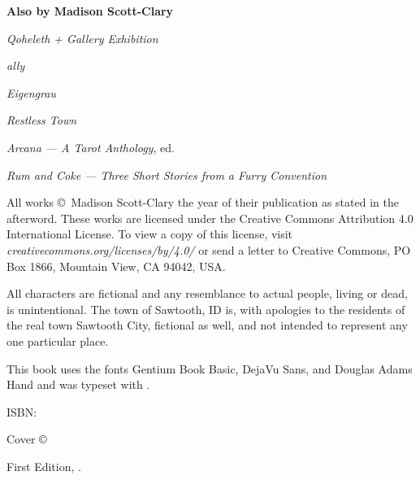 
\thispagestyle{empty}
\null
\vfill
\begin{center}
    \textbf{Also by Madison Scott-Clary}

    \emph{Qoheleth + Gallery Exhibition}

    \emph{ally}

    \emph{Eigengrau}

    \emph{Restless Town}

    \emph{Arcana --- A Tarot Anthology}, ed.

    \emph{Rum and Coke --- Three Short Stories from a Furry Convention}
\end{center}
\vfill
\singlespacing
{\small\parindent0pt\parskip5pt
\noindent All works \copyright\ Madison Scott-Clary the year of their publication as stated in the afterword. These works are licensed under the Creative Commons Attribution 4.0 International License. To view a copy of this license, visit \mbox{\emph{creativecommons.org/licenses/by/4.0/}} or send a letter to Creative Commons, PO Box 1866, Mountain View, CA 94042, USA.

All characters are fictional and any resemblance to actual people, living or dead, is unintentional. The town of Sawtooth, ID is, with apologies to the residents of the real town Sawtooth City, fictional as well, and not intended to represent any one particular place.

This book uses the fonts Gentium Book Basic, DejaVu Sans, and Douglas Adams Hand and was typeset with {\XeLaTeX}.

\vspace{1ex}

ISBN: \ISBN

\vspace{1ex}

\emph{\Title}

\vspace{1ex}

Cover \copyright\ \Year\ \Illustrator\\
\IllustratorWeb

\vspace{1ex}

First Edition, \Year.

\EditionsList
}

\cleardoublepage
